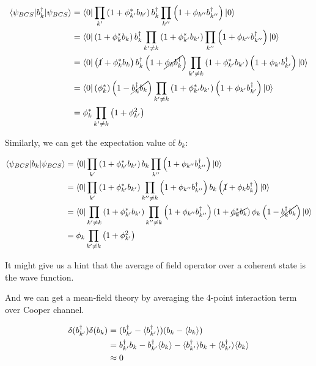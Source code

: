 \documentclass[14pt, a4paper]{extarticle}
\DeclarePairedDelimiter\bra{\langle}{\rvert}
\DeclarePairedDelimiter\ket{\lvert}{\rangle}
\DeclarePairedDelimiter\avg{\langle}{\rangle}
\begin{document}
\begin{align}
    \bra{\psi_{BCS}} b_{k}^\dagger \ket{\psi_{BCS}} & = \bra{0} \prod_{k'} \left(1 + \phi^*_{k'} b_{k'}\right) b_{k}^\dagger \prod_{k''} \left(1 + \phi_{k''} b_{k''}^\dagger\right) \ket{0} \\
    & = \bra{0} \left(1 + \phi^*_{k} b_{k} \right) b^\dagger_{k} \prod_{k'\neq k} \left(1 + \phi^*_{k'} b_{k'}\right) \prod_{k''} \left(1 + \phi_{k''} b_{k''}^\dagger\right) \ket{0} \\
    & = \bra{0} \left( \cancel{1} + \phi^*_{k} b_{k} \right) b^\dagger_{k} \left( 1 + \cancel{\phi_{k} b^\dagger_{k}} \right) \prod_{k'\neq k} \left(1 + \phi^*_{k'} b_{k'}\right) \left(1 + \phi_{k'} b_{k'}^\dagger\right)\ket{0} \\
    & = \bra{0} \left(\phi^*_{k} \right) \left( 1 - \cancel{ b^\dagger_{k}  b_{k}} \right) \prod_{k'\neq k} \left(1 + \phi^*_{k'} b_{k'}\right) \left(1 + \phi_{k'} b_{k'}^\dagger\right)\ket{0} \\
    & = \phi^*_{k} \prod_{k'\neq k} \left(1 + \phi^2_{k'}\right)  \\
\end{align}

Similarly, we can get the expectation value of $b_{k}$:

\begin{align}
    \bra{\psi_{BCS}} b_{k} \ket{\psi_{BCS}} & = \bra{0} \prod_{k'} \left(1 + \phi^*_{k'} b_{k'}\right) b_{k} \prod_{k''} \left(1 + \phi_{k''} b_{k''}^\dagger\right) \ket{0} \\
    & = \bra{0} \prod_{k'} \left(1 + \phi^*_{k'} b_{k'}\right) \prod_{k''\neq k} \left(1 + \phi_{k''} b_{k''}^\dagger\right) b_{k} \left(\cancel{1} + \phi_{k} b_{k}^\dagger\right)\ket{0} \\
    & = \bra{0} \prod_{k'\neq k} \left(1 + \phi^*_{k'} b_{k'}\right) \prod_{k''\neq k} \left(1 + \phi_{k''} b_{k''}^\dagger\right) \left(1 + \cancel{\phi^*_{k} b_{k}}\right) \phi_{k} \left( 1 - \cancel{b_{k}^\dagger b_{k}}\right)\ket{0} \\
    & = \phi_{k} \prod_{k'\neq k} \left(1 + \phi^2_{k'}\right)  \\
\end{align}

It might give us a hint that the average of field operator over a coherent state is the wave function.

And we can get a mean-field theory by averaging the 4-point interaction term over Cooper channel.

\begin{align}
    \delta(b^\dagger_{k'})\delta(b_{k}) & = (b^\dagger_{k'} - \avg{b^\dagger_{k'}})(b_{k} - \avg{b_{k}}) \\
    & = b^\dagger_{k'} b_{k} - b^\dagger_{k'} \avg{b_{k}} - \avg{b^\dagger_{k'}} b_{k} + \avg{b^\dagger_{k'}} \avg{b_{k}} \\
    & \approx 0
\end{align}
\end{document}
